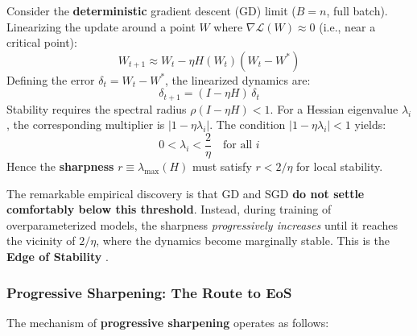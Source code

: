 \documentclass[
  journal=largetwo,
  year=2025,
  volume=37,
]{cup-journal}
\begin{document}
Consider the \textbf{deterministic} gradient descent (GD) limit ($B = n$, full batch). Linearizing the update around a point $W$ where $\nabla \mathcal{L}(W) \approx 0$ (i.e., near a critical point):
\begin{equation}
    W_{t+1} \approx W_t - \eta H(W_t)(W_t - W^*)
\end{equation}
Defining the error $\delta_t = W_t - W^*$, the linearized dynamics are:
\begin{equation}
    \delta_{t+1} = (I - \eta H)\,\delta_t
\end{equation}
Stability requires the spectral radius $\rho(I - \eta H) < 1$. For a Hessian eigenvalue $\lambda_i$, the corresponding multiplier is $|1 - \eta \lambda_i|$. The condition $|1 - \eta \lambda_i| < 1$ yields:
\begin{equation}\label{eq:eos_condition}
    0 < \lambda_i < \frac{2}{\eta} \quad \text{for all } i
\end{equation}
Hence the \textbf{sharpness} $r \equiv \lambda_{\max}(H)$ must satisfy $r < 2/\eta$ for local stability.

The remarkable empirical discovery is that GD and SGD \textbf{do not settle comfortably below this threshold}. Instead, during training of overparameterized models, the sharpness \textit{progressively increases} until it reaches the vicinity of $2/\eta$, where the dynamics become marginally stable. This is the \textbf{Edge of Stability} \cite{cohen2021gradient}.

\subsubsection{Progressive Sharpening: The Route to EoS}

The mechanism of \textbf{progressive sharpening} operates as follows:
\end{document}
